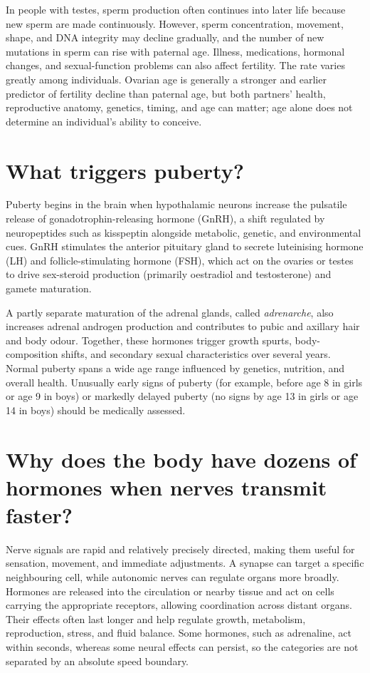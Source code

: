 \documentclass[11pt,oneside]{report}
\begin{document}
In people with testes, sperm production often continues into later life because
new sperm are made continuously. However, sperm concentration, movement,
shape, and DNA integrity may decline gradually, and the number of new mutations
in sperm can rise with paternal age. Illness, medications, hormonal changes,
and sexual-function problems can also affect fertility. The rate varies greatly
among individuals. Ovarian age is generally a stronger and earlier predictor of
fertility decline than paternal age, but both partners' health, reproductive
anatomy, genetics, timing, and age can matter; age alone does not determine an
individual's ability to conceive.

\section{What triggers puberty?}

Puberty begins in the brain when hypothalamic neurons increase the pulsatile
release of gonadotrophin-releasing hormone (GnRH), a shift regulated by
neuropeptides such as kisspeptin alongside metabolic, genetic, and
environmental cues. GnRH stimulates the anterior pituitary gland to secrete
luteinising hormone (LH) and follicle-stimulating hormone (FSH), which act on
the ovaries or testes to drive sex-steroid production (primarily oestradiol and
testosterone) and gamete maturation.

A partly separate maturation of the adrenal glands, called \emph{adrenarche},
also increases adrenal androgen production and contributes to pubic and
axillary hair and body odour. Together, these hormones trigger growth spurts,
body-composition shifts, and secondary sexual characteristics over several
years. Normal puberty spans a wide age range influenced by genetics, nutrition,
and overall health. Unusually early signs of puberty (for example, before age 8
in girls or age 9 in boys) or markedly delayed puberty (no signs by age 13 in
girls or age 14 in boys) should be medically assessed.

\section{Why does the body have dozens of hormones when nerves transmit faster?}

Nerve signals are rapid and relatively precisely directed, making them useful
for sensation, movement, and immediate adjustments. A synapse can target a
specific neighbouring cell, while autonomic nerves can regulate organs more
broadly. Hormones are released into the circulation or nearby tissue and act on
cells carrying the appropriate receptors, allowing coordination across distant
organs. Their effects often last longer and help regulate growth, metabolism,
reproduction, stress, and fluid balance. Some hormones, such as adrenaline,
act within seconds, whereas some neural effects can persist, so the categories
are not separated by an absolute speed boundary.
\end{document}
